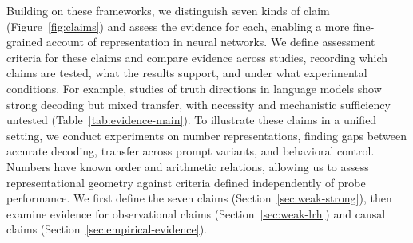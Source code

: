 \documentclass[11pt]{article}
\begin{document}
Building on these frameworks, we distinguish seven kinds of claim (Figure~\ref{fig:claims}) and assess the evidence for each, enabling a more fine-grained account of representation in neural networks.
We define assessment criteria for these claims and compare evidence across studies, recording which claims are tested, what the results support, and under what experimental conditions.
For example, studies of truth directions in language models show strong decoding but mixed transfer, with necessity and mechanistic sufficiency untested (Table~\ref{tab:evidence-main}).
To illustrate these claims in a unified setting, we conduct experiments on number representations, finding gaps between accurate decoding, transfer across prompt variants, and behavioral control.
Numbers have known order and arithmetic relations, allowing us to assess representational geometry against criteria defined independently of probe performance.
We first define the seven claims (Section~\ref{sec:weak-strong}), then examine evidence for observational claims (Section~\ref{sec:weak-lrh}) and causal claims (Section~\ref{sec:empirical-evidence}).
\end{document}
